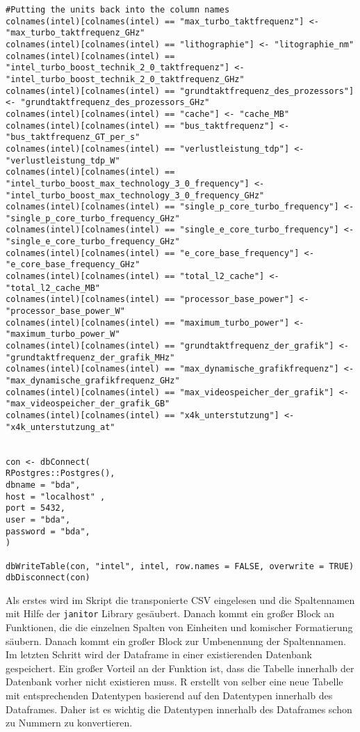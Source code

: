 \begin{lstlisting}[caption={\texttt{database.R}},captionpos=b]
#Putting the units back into the column names
colnames(intel)[colnames(intel) == "max_turbo_taktfrequenz"] <- "max_turbo_taktfrequenz_GHz"
colnames(intel)[colnames(intel) == "lithographie"] <- "litographie_nm"
colnames(intel)[colnames(intel) == "intel_turbo_boost_technik_2_0_taktfrequenz"] <- "intel_turbo_boost_technik_2_0_taktfrequenz_GHz"
colnames(intel)[colnames(intel) == "grundtaktfrequenz_des_prozessors"] <- "grundtaktfrequenz_des_prozessors_GHz"
colnames(intel)[colnames(intel) == "cache"] <- "cache_MB"
colnames(intel)[colnames(intel) == "bus_taktfrequenz"] <- "bus_taktfrequenz_GT_per_s"
colnames(intel)[colnames(intel) == "verlustleistung_tdp"] <- "verlustleistung_tdp_W"
colnames(intel)[colnames(intel) == "intel_turbo_boost_max_technology_3_0_frequency"] <- "intel_turbo_boost_max_technology_3_0_frequency_GHz"
colnames(intel)[colnames(intel) == "single_p_core_turbo_frequency"] <- "single_p_core_turbo_frequency_GHz"
colnames(intel)[colnames(intel) == "single_e_core_turbo_frequency"] <- "single_e_core_turbo_frequency_GHz"
colnames(intel)[colnames(intel) == "e_core_base_frequency"] <- "e_core_base_frequency_GHz"
colnames(intel)[colnames(intel) == "total_l2_cache"] <- "total_l2_cache_MB"
colnames(intel)[colnames(intel) == "processor_base_power"] <- "processor_base_power_W"
colnames(intel)[colnames(intel) == "maximum_turbo_power"] <- "maximum_turbo_power_W"
colnames(intel)[colnames(intel) == "grundtaktfrequenz_der_grafik"] <- "grundtaktfrequenz_der_grafik_MHz"
colnames(intel)[colnames(intel) == "max_dynamische_grafikfrequenz"] <- "max_dynamische_grafikfrequenz_GHz"
colnames(intel)[colnames(intel) == "max_videospeicher_der_grafik"] <- "max_videospeicher_der_grafik_GB"
colnames(intel)[colnames(intel) == "x4k_unterstutzung"] <- "x4k_unterstutzung_at"


con <- dbConnect(
RPostgres::Postgres(),
dbname = "bda",
host = "localhost" ,
port = 5432,
user = "bda",
password = "bda",
)

dbWriteTable(con, "intel", intel, row.names = FALSE, overwrite = TRUE)
dbDisconnect(con)
\end{lstlisting}

Als erstes wird im Skript die transponierte CSV eingelesen und die Spaltennamen mit Hilfe der  \lstinline |janitor| Library gesäubert. Danach kommt ein großer Block an Funktionen, die die einzelnen Spalten von Einheiten und komischer Formatierung säubern.
Danach kommt ein großer Block zur Umbenennung der Spaltennamen. 
Im letzten Schritt wird der Dataframe in einer existierenden Datenbank gespeichert. 
Ein großer Vorteil an der Funktion ist, dass die Tabelle innerhalb der Datenbank vorher nicht existieren muss. 
R erstellt von selber eine neue Tabelle mit entsprechenden Datentypen basierend auf den Datentypen innerhalb des Dataframes. Daher ist es wichtig die Datentypen innerhalb des Dataframes schon zu Nummern zu konvertieren.

